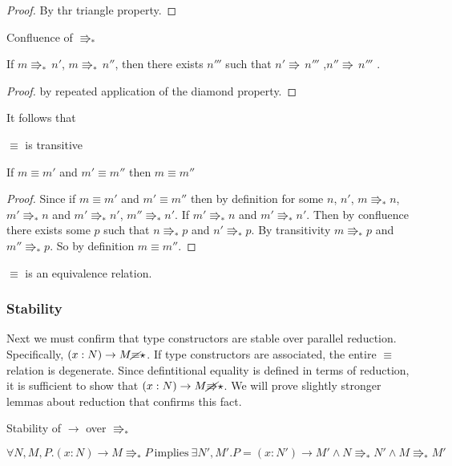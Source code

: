 \begin{proof}
By thr triangle property.
\end{proof}
\begin{thm}
Confluence of $\Rrightarrow_{\ast}$ 

If $m\Rrightarrow_{\ast}\,n'$, $m\Rrightarrow_{\ast}\,n''$, then
there exists $n'''$ such that $n'\Rrightarrow\,n'''$ ,$n''\Rrightarrow\,n'''$
.
\end{thm}

\begin{proof}
by repeated application of the diamond property.
\end{proof}
It follows that
\begin{thm}
$\equiv$ is transitive

If $m\equiv m'$ and $m'\equiv m''$ then $m\equiv m''$
\end{thm}

\begin{proof}
Since if $m\equiv m'$ and $m'\equiv m''$ then by definition for some $n$, $n'$, $m\Rrightarrow_{\ast}n$, $m'\Rrightarrow_{\ast}n$ and $m'\Rrightarrow_{\ast}n'$, $m''\Rrightarrow_{\ast}n'$. If $m'\Rrightarrow_{\ast}n$ and $m'\Rrightarrow_{\ast}n'$.
Then by confluence there exists some $p$ such that $n\Rrightarrow_{\ast}p$ and $n'\Rrightarrow_{\ast}p$.
By transitivity $m\Rrightarrow_{\ast}p$ and $m''\Rrightarrow_{\ast}p$.
So by definition $m\equiv m''$.
\end{proof}
\begin{fact}
$\equiv$ is an equivalence relation.
\end{fact}


\subsubsection{Stability}
Next we must confirm that type constructors are stable over parallel reduction.
Specifically, $\left(x:N\right)\rightarrow M\cancel{\equiv}\star$.
If type constructors are associated, the entire $\equiv$ relation is degenerate.
Since defintitional equality is defined in terms of reduction, it is sufficient to show that $\left(x:N\right)\rightarrow M\cancel{\Rrightarrow}\star$.
We will prove slightly stronger lemmas about reduction that confirms this fact.

\begin{lem}
Stability of $\rightarrow$ over $\Rrightarrow_{\ast}$

$\forall N,M,P.\left(x:N\right)\rightarrow M\Rrightarrow_{\ast}P\:\mathrm{implies}\:\exists N',M'.P=\left(x:N'\right)\rightarrow M'\land N\Rrightarrow_{\ast}N'\land M\Rrightarrow_{\ast}M'$
\end{lem}

